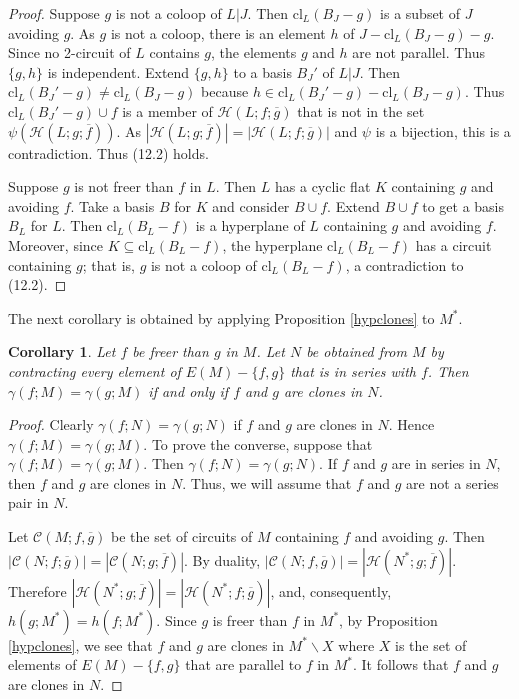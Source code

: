 \documentclass[12pt,reqno]{amsart}
\newtheorem{corollary}[theorem]{Corollary}
\theoremstyle{definition}
\theoremstyle{remark}
\numberwithin{equation}{section}
\newcommand{\del}{\backslash}
\newcommand{\cl}{\text{cl}}
\begin{document}
\begin{proof}
    Suppose $g$ is not a coloop of $L|J$. 
    Then $\cl_{L}(B_J-g)$ is a subset of $J$ avoiding $g$. 
    As $g$ is not a coloop, there is an element $h$ of $J-\cl_{L}(B_J-g)-g$. 
    Since no 2-circuit of $L$ contains $g$, the elements $g$ and $h$ are not parallel. 
    Thus $\{g,h\}$ is independent. 
    Extend $\{g,h\}$ to a basis $B_J'$ of $L|J$. 
    Then $\cl_{L}(B_J'-g)\neq\cl_{L}(B_J-g)$ because $h\in \cl_{L}(B_J'-g)-\cl_{L}(B_J-g)$. 
    Thus $\cl_{L}(B_J'-g)\cup f$ is a member of $\mathcal{H}(L;f;\overline g)$ that is not in the set $\psi(\mathcal{H}(L;g;\overline f))$.
    As $|\mathcal{H}(L;g;\overline f)|=|\mathcal{H}(L;f;\overline g)|$ and $\psi$ is a bijection, this is a contradiction. Thus (12.2) holds. 

    \smallskip

    Suppose $g$ is not freer than $f$ in $L$.
    Then $L$ has a cyclic flat $K$ containing $g$ and avoiding $f$. 
    Take a basis $B$ for $K$ and consider $B \cup f$. 
    Extend $B\cup f$ to get a basis $B_{L}$ for $L$. 
    Then $\cl_L(B_{L}-f)$ is a hyperplane of $L$ containing $g$ and avoiding $f$. 
    Moreover, since $K\subseteq \cl_L(B_{L}-f)$, the hyperplane $\cl_L(B_{L}-f)$ has a circuit containing $g$; that is, $g$ is not a coloop of $\cl_L(B_{L}-f)$, a contradiction to (12.2).
       \end{proof} 

       The next corollary is obtained by applying Proposition \ref{hypclones} to $M^*$. 

\begin{corollary}\label{ccteq}
    Let $f$ be freer than $g$ in $M$. 
    Let $N$ be obtained from $M$ by contracting every element of $E(M)-\{f,g\}$ that is in series with $f$. 
    Then $\gamma(f;M)=\gamma(g;M)$ if and only if $f$ and $g$ are clones in $N$.     
\end{corollary}
\begin{proof}
    Clearly $\gamma(f;N)=\gamma(g;N)$ if $f$ and $g$ are clones in $N$.  
    Hence $\gamma(f;M)=\gamma(g;M)$. 
    To prove the converse, suppose that $\gamma(f;M)=\gamma(g;M)$. 
    Then $\gamma(f;N)=\gamma(g;N)$. 
    If $f$ and $g$ are in series in $N$, then $f$ and $g$ are clones in $N$.  
    Thus, we will assume that $f$ and $g$ are not a series pair in $N$.  
    
    Let $\mathcal{C}(M;f,\overline g)$ be the set of circuits of $M$ containing $f$ and avoiding $g$. 
    Then $|\mathcal{C}(N;f;\overline g)|=|\mathcal{C}(N;g;\overline f)|$. 
    By duality, $|\mathcal{C}(N;f,\overline g)|=|\mathcal{H}(N^*;g;\overline f)|$.
    Therefore $|\mathcal{H}(N^*;g;\overline f)|=|\mathcal{H}(N^*;f;\overline g)|$, and, consequently, $h(g;M^*)=h(f;M^*)$. 
    Since $g$ is freer than $f$ in $M^*$, by Proposition \ref{hypclones}, we see that $f$ and $g$ are clones in $M^*\del X$ where $X$ is the set of elements of $E(M)-\{f,g\}$ that are parallel to $f$ in $M^*$.
    It follows that $f$ and $g$ are clones in $N$. 
\end{proof}
\end{document}
